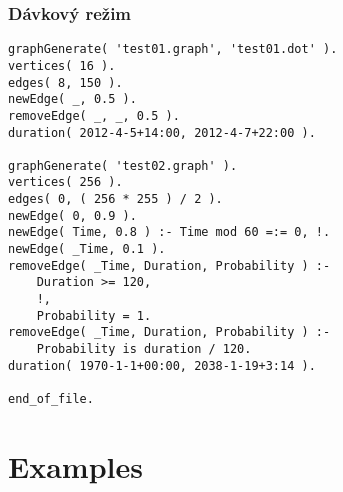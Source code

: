 \documentclass[11pt, a4paper,draft]{article}
\theoremstyle{plain}
\theoremstyle{definition}
\theoremstyle{remark}
\begin{document}
\subsubsection{Dávkový režim}

\begin{lstlisting}[firstnumber=1]
% gen_graph.pl
graphGenerate( 'test01.graph', 'test01.dot' ).
vertices( 16 ).
edges( 8, 150 ).
newEdge( _, 0.5 ).
removeEdge( _, _, 0.5 ).
duration( 2012-4-5+14:00, 2012-4-7+22:00 ).

graphGenerate( 'test02.graph' ).
vertices( 256 ).
edges( 0, ( 256 * 255 ) / 2 ).
newEdge( 0, 0.9 ).
newEdge( Time, 0.8 ) :- Time mod 60 =:= 0, !.
newEdge( _Time, 0.1 ).
removeEdge( _Time, Duration, Probability ) :-
    Duration >= 120,
    !,
    Probability = 1.
removeEdge( _Time, Duration, Probability ) :-
    Probability is duration / 120.
duration( 1970-1-1+00:00, 2038-1-19+3:14 ).

end_of_file.
\end{lstlisting}

\section{Examples}

\end{document}
